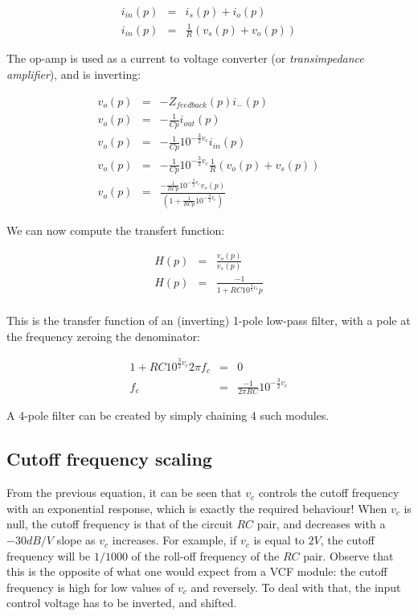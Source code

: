 \documentclass[a4paper,11pt]{article}
\begin{document}
\begin{eqnarray*}
i_{in}(p) &=& i_s(p) + i_o(p) \\
i_{in}(p) &=& \frac{1}{R}(v_s(p) + v_o(p))
\end{eqnarray*}

The op-amp is used as a current to voltage converter (or \emph{transimpedance amplifier}), and is inverting:

\begin{eqnarray*}
v_o(p) &=& -Z_{feedback}(p) i_-(p) \\
v_o(p) &=& -\frac{1}{Cp} i_{out}(p) \\
v_o(p) &=& -\frac{1}{Cp} 10^{-\frac{3}{2} v_c} i_{in}(p) \\
v_o(p) &=& -\frac{1}{Cp} 10^{-\frac{3}{2} v_c} \frac{1}{R}(v_o(p) + v_s(p)) \\
v_o(p) &=& \frac{-\frac{1}{RCp} 10^{-\frac{3}{2} v_c}v_s(p)}{\left(1 + \frac{1}{RCp} 10^{-\frac{3}{2} v_c} \right)}
\end{eqnarray*}

We can now compute the transfert function:

\begin{eqnarray*}
H(p) &=& \frac{v_o(p)}{v_s(p)} \\
H(p) &=& \frac{-1}{1 + RC 10^{\frac{3}{2} v_c} p} \\
\end{eqnarray*}

This is the transfer function of an (inverting) 1-pole low-pass filter, with a pole at the frequency zeroing the denominator:

\begin{eqnarray*}
1 + RC 10^{\frac{3}{2} v_c} 2 \pi f_c &=& 0 \\
f_c &=& \frac{-1}{2 \pi RC} 10^{-\frac{3}{2} v_c}
\end{eqnarray*}

A 4-pole filter can be created by simply chaining 4 such modules.

\subsection{Cutoff frequency scaling}

From the previous equation, it can be seen that $v_c$ controls the cutoff frequency with an exponential response, which is exactly the required behaviour! When $v_c$ is null, the cutoff frequency is that of the circuit $RC$ pair, and decreases with a $-30dB/V$ slope as $v_c$ increases. For example, if $v_c$ is equal to $2V$, the cutoff frequency will be $1/1000$ of the roll-off frequency of the $RC$ pair. Observe that this is the opposite of what one would expect from a VCF module: the cutoff frequency is high for low values of $v_c$ and reversely. To deal with that, the input control voltage has to be inverted, and shifted.
\end{document}
